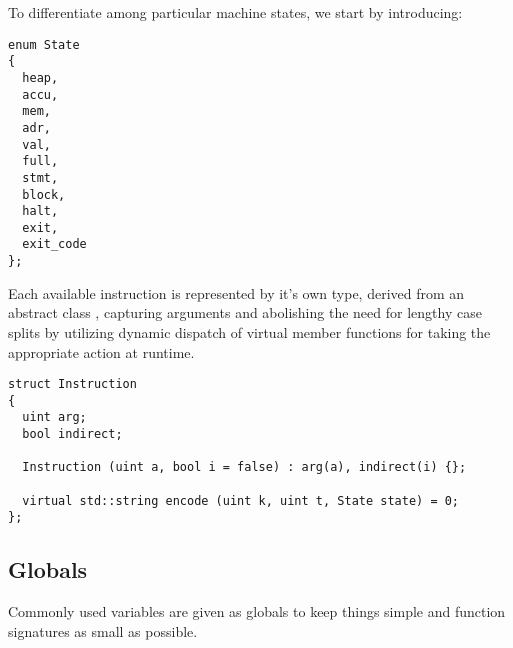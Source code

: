 To differentiate among particular machine states, we start by introducing:%


\begin{lstlisting}[style=c++]
enum State
{
  heap,
  accu,
  mem,
  adr,
  val,
  full,
  stmt,
  block,
  halt,
  exit,
  exit_code
};
\end{lstlisting}
Each available instruction is represented by it's own type, derived from an abstract class , capturing arguments and abolishing the need for lengthy case splits by utilizing dynamic dispatch of virtual member functions for taking the appropriate action at runtime.%

\begin{lstlisting}[style=c++]
struct Instruction
{
  uint arg;
  bool indirect;

  Instruction (uint a, bool i = false) : arg(a), indirect(i) {};

  virtual std::string encode (uint k, uint t, State state) = 0;
};
\end{lstlisting}

\subsection*{Globals}

Commonly used variables are given as globals to keep things simple and function signatures as small as possible.

